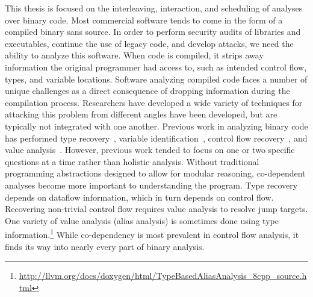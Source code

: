 {\fontsize{10}{12}\selectfont
This thesis is focused on the interleaving, interaction, and scheduling of analyses over binary code.
Most commercial software tends to come in the form of a compiled binary sans source.
In order to perform security audits of libraries and executables, continue the use of legacy code, and develop attacks, we need the ability to analyze this software.
When code is compiled, it strips away information the original programmer had access to, such as intended control flow, types, and variable locations.
Software analyzing compiled code faces a number of unique challenges as a direct consequence of dropping information during the compilation process.
Researchers have developed a wide variety of techniques for attacking this problem from different angles have been developed, but are typically not integrated with one another.
Previous work in analyzing binary code has performed type recovery~\cite{bitr}, variable identification~\cite{divine}, control flow recovery~\cite{jakstab,phoenix}, and value analysis~\cite{vsa}.
However, previous work tended to focus on one or two specific questions at a time rather than holistic analysis.
Without traditional programming abstractions designed to allow for modular reasoning, co-dependent analyses become more important to understanding the program.
Type recovery depends on dataflow information\cite{bitr,tie,sndwrite}, which in turn depends on control flow.
Recovering non-trivial control flow requires value analysis to resolve jump targets.
One variety of value analysis (alias analysis) is sometimes done using type information.\footnote {
  \url{http://llvm.org/docs/doxygen/html/TypeBasedAliasAnalysis_8cpp_source.html}
}
While co-dependency is most prevalent in control flow analysis, it finds its way into nearly every part of binary analysis.
}

